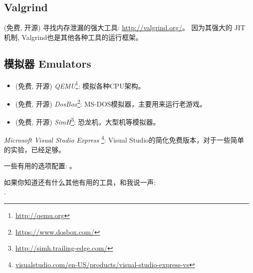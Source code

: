 \documentclass[UTF8,nofonts]{ctexart}
\begin{document}
\subsection{Valgrind}

(免费, 开源) 寻找内存泄漏的强大工具: \url{http://valgrind.org/}。
因为其强大的 \ac{JIT} 机制, Valgrind也是其他各种工具的运行框架。


\subsection{模拟器 Emulators}

\begin{itemize}
\item (免费, 开源) \emph{QEMU}\footnote{\url{http://qemu.org}}: 模拟各种CPU架构。

\item (免费, 开源) \emph{DosBox}\footnote{\url{https://www.dosbox.com/}}: MS-DOS模拟器，主要用来运行老游戏。 

\item (免费, 开源) \emph{SimH}\footnote{\url{http://simh.trailing-edge.com/}}: 恐龙机，大型机等模拟器。
\end{itemize}


\emph{Microsoft Visual Studio Express}
\footnote{\href{http://go.yurichev.com/17034}{visualstudio.com/en-US/products/visual-studio-express-vs}}:
Visual Studio的简化免费版本，对于一些简单的实验，已经足够。

一些有用的选项配置: 。


如果你知道还有什么其他有用的工具，和我说一声:\\
\TT{\EMAIL}.
\end{document}
